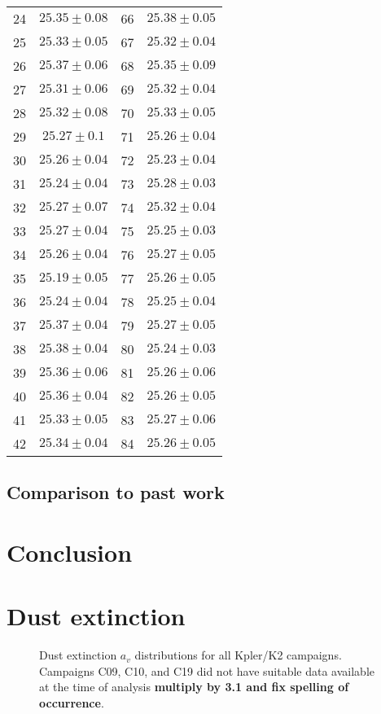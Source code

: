 \documentclass{aastex63}
\begin{document}
\begin{table*}
\begin{tabular}{lc|lc}
24 & $25.35\pm0.08$ & 66 & $25.38\pm0.05$ \\
25 & $25.33\pm0.05$ & 67 & $25.32\pm0.04$ \\
26 & $25.37\pm0.06$ & 68 & $25.35\pm0.09$ \\
27 & $25.31\pm0.06$ & 69 & $25.32\pm0.04$ \\
28 & $25.32\pm0.08$ & 70 & $25.33\pm0.05$ \\
29 & $25.27\pm0.1$ & 71 & $25.26\pm0.04$ \\
30 & $25.26\pm0.04$ & 72 & $25.23\pm0.04$ \\
31 & $25.24\pm0.04$ & 73 & $25.28\pm0.03$ \\
32 & $25.27\pm0.07$ & 74 & $25.32\pm0.04$ \\
33 & $25.27\pm0.04$ & 75 & $25.25\pm0.03$ \\
34 & $25.26\pm0.04$ & 76 & $25.27\pm0.05$ \\
35 & $25.19\pm0.05$ & 77 & $25.26\pm0.05$ \\
36 & $25.24\pm0.04$ & 78 & $25.25\pm0.04$ \\
37 & $25.37\pm0.04$ & 79 & $25.27\pm0.05$ \\
38 & $25.38\pm0.04$ & 80 & $25.24\pm0.03$ \\
39 & $25.36\pm0.06$ & 81 & $25.26\pm0.06$ \\
40 & $25.36\pm0.04$ & 82 & $25.26\pm0.05$ \\
41 & $25.33\pm0.05$ & 83 & $25.27\pm0.06$ \\
42 & $25.34\pm0.04$ & 84 & $25.26\pm0.05$ \\

  \hline
 \end{tabular}
\end{table*}

\subsection{Comparison to past work}


\section{Conclusion}


\appendix
\section{Dust extinction}


\begin{figure}
\caption{Dust extinction $a_v$ distributions for all Kpler/K2 campaigns. Campaigns C09, C10, and C19 did not have suitable data available at the time of analysis \textbf{multiply by 3.1 and fix spelling of occurrence}. \label{fig:all_dust_hist}}
\end{figure}
\end{document}
